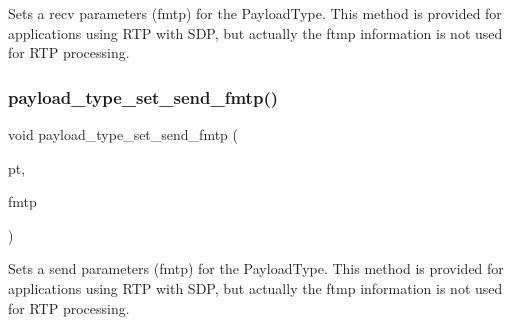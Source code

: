 Sets a recv parameters (fmtp) for the Payload\+Type. This method is provided for applications using R\+TP with S\+DP, but actually the ftmp information is not used for R\+TP processing. \mbox{\label{payloadtype_8h_afc2a8ed40940b89cd6303f27613fa827}} 
\subsubsection{payload\+\_\+type\+\_\+set\+\_\+send\+\_\+fmtp()}
{\footnotesize\ttfamily void payload\+\_\+type\+\_\+set\+\_\+send\+\_\+fmtp (\begin{DoxyParamCaption}\item[{\textbf{ Payload\+Type} $\ast$}]{pt,  }\item[{const char $\ast$}]{fmtp }\end{DoxyParamCaption})}

Sets a send parameters (fmtp) for the Payload\+Type. This method is provided for applications using R\+TP with S\+DP, but actually the ftmp information is not used for R\+TP processing. 
